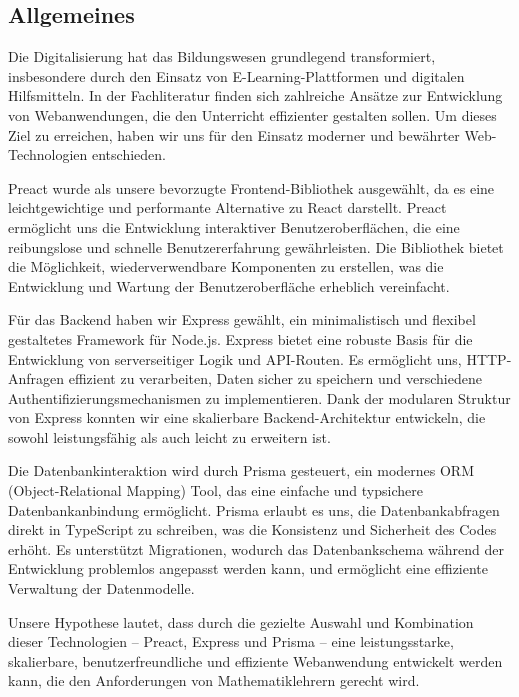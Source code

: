 \subsection{Allgemeines}
Die Digitalisierung hat das Bildungswesen grundlegend transformiert, insbesondere durch den Einsatz von E-Learning-Plattformen und digitalen Hilfsmitteln. In der Fachliteratur finden sich zahlreiche Ansätze zur Entwicklung von Webanwendungen, die den Unterricht effizienter gestalten sollen. Um dieses Ziel zu erreichen, haben wir uns für den Einsatz moderner und bewährter Web-Technologien entschieden.

Preact wurde als unsere bevorzugte Frontend-Bibliothek ausgewählt, da es eine leichtgewichtige und performante Alternative zu React darstellt. Preact ermöglicht uns die Entwicklung interaktiver Benutzeroberflächen, die eine reibungslose und schnelle Benutzererfahrung gewährleisten. Die Bibliothek bietet die Möglichkeit, wiederverwendbare Komponenten zu erstellen, was die Entwicklung und Wartung der Benutzeroberfläche erheblich vereinfacht.

Für das Backend haben wir Express gewählt, ein minimalistisch und flexibel gestaltetes Framework für Node.js. Express bietet eine robuste Basis für die Entwicklung von serverseitiger Logik und API-Routen. Es ermöglicht uns, HTTP-Anfragen effizient zu verarbeiten, Daten sicher zu speichern und verschiedene Authentifizierungsmechanismen zu implementieren. Dank der modularen Struktur von Express konnten wir eine skalierbare Backend-Architektur entwickeln, die sowohl leistungsfähig als auch leicht zu erweitern ist.

Die Datenbankinteraktion wird durch Prisma gesteuert, ein modernes ORM (Object-Relational Mapping) Tool, das eine einfache und typsichere Datenbankanbindung ermöglicht. Prisma erlaubt es uns, die Datenbankabfragen direkt in TypeScript zu schreiben, was die Konsistenz und Sicherheit des Codes erhöht. Es unterstützt Migrationen, wodurch das Datenbankschema während der Entwicklung problemlos angepasst werden kann, und ermöglicht eine effiziente Verwaltung der Datenmodelle.

Unsere Hypothese lautet, dass durch die gezielte Auswahl und Kombination dieser Technologien – Preact, Express und Prisma – eine leistungsstarke, skalierbare, benutzerfreundliche und effiziente Webanwendung entwickelt werden kann, die den Anforderungen von Mathematiklehrern gerecht wird.